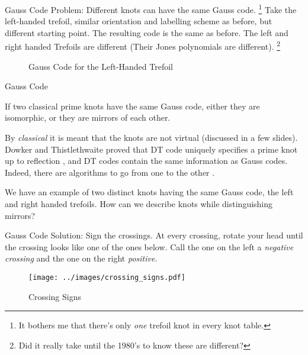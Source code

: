 \documentclass{beamer}
\begin{document}
    \begin{frame}{Gauss Code}
        Problem: Different knots can have the same Gauss code.%
        \footnote{%
            It bothers me that there's only \textit{one} trefoil knot in every
            knot table.
        }
        Take the left-handed trefoil, similar orientation and labelling scheme
        as before, but different starting point. The resulting code is the same
        as before. The left and right handed Trefoils are different
        (Their Jones polynomials are different).%
        \footnote{
            Did it really take until the 1980's to know these are different?
        }
        \begin{figure}
            \centering
            \caption{Gauss Code for the Left-Handed Trefoil}
            \label{fig:left_handed_trefoil_gauss_code}
        \end{figure}
    \end{frame}
    \begin{frame}{Gauss Code}
        \begin{theorem}
            If two classical prime knots have the same Gauss code, either they
            are isomorphic, or they are mirrors of each other.
        \end{theorem}
        By \textit{classical} it is meant that the knots are not virtual
        (discussed in a few slides). Dowker and Thistlethwaite proved that DT
        code uniquely specifies a prime knot up to reflection
        \cite{DOWKER198319}, and DT codes
        contain the same information as Gauss codes. Indeed, there are
        algorithms to go from one to the other \cite{KatlasDTCodes}.
        \par\hfill\par
        We have an example of two distinct knots having the same Gauss code,
        the left and right handed trefoils. How can we describe knots while
        distinguishing mirrors?
    \end{frame}
    \begin{frame}{Gauss Code}
        Solution: Sign the crossings. At every crossing, rotate your head until
        the crossing looks like one of the ones below. Call the one on the left
        a \textit{negative crossing} and the one on the right \textit{positive}.
        \begin{figure}
            \centering
            \texttt{[image: ../images/crossing\_signs.pdf]}
            \caption{Crossing Signs}
            \label{fig:crossing_signs}
        \end{figure}
    \end{frame}
\end{document}
